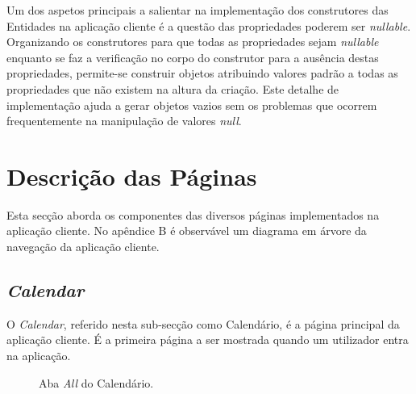 Um dos aspetos principais a salientar na implementação dos construtores das Entidades na aplicação cliente é a questão das propriedades poderem ser \emph{nullable}. Organizando os construtores para que todas as propriedades sejam \emph{nullable} enquanto se faz a verificação no corpo do construtor para a ausência destas propriedades, permite-se construir objetos atribuindo valores padrão a todas as propriedades que não existem na altura da criação. Este detalhe de implementação ajuda a gerar objetos vazios sem os problemas que ocorrem frequentemente na manipulação de valores \emph{null}.

\section{Descrição das Páginas}\label{sec42}

Esta secção aborda os componentes das diversos páginas implementados na aplicação cliente. No apêndice B é observável um diagrama em árvore da navegação da aplicação cliente.

\subsection{\textit{Calendar}}\label{subsec422}

O \textit{Calendar}, referido nesta sub-secção como Calendário, é a página principal da aplicação cliente. É a primeira página a ser mostrada quando um utilizador entra na aplicação. 

\begin{figure}[h]
	\begin{center}
	\end{center}
	\caption{Aba \textit{All} do Calendário.}\label{fig:calendarall}
\end{figure}

